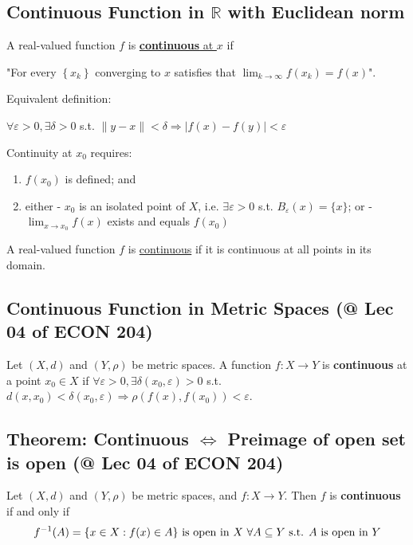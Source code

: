 \documentclass[11pt]{elegantbook}
\begin{document}
\subsection{Continuous Function in $\mathbb{R}$ with Euclidean norm}
\begin{definition}
    \normalfont
    A real-valued function $f$ is \underline{\textbf{continuous} at $x$} if
    
    "For every $\left\{x_{k}\right\}$ converging to $x$ satisfies that $\lim _{k \rightarrow \infty} f\left(x_{k}\right)=f(x)$".

    Equivalent definition:

    $\forall \varepsilon>0, \exists \delta>0$ s.t.
    $\|y-x\|<\delta \Rightarrow |f(x)-f(y)|<\varepsilon$
\end{definition}
Continuity at $x_0$ requires:
\begin{enumerate}
    \item $f(x_0)$ is defined; and
    \item either
    \subitem - $x_0$ is an isolated point of $X$, i.e. $\exists \varepsilon > 0$ s.t. $B_\varepsilon(x) = \{x\}$; or
    \subitem - $\lim_{x \rightarrow x_0} f(x)$ exists and equals $f(x_0)$
\end{enumerate}

\begin{definition}
    \normalfont
    A real-valued function $f$ is \underline{continuous} if it is continuous at all points in its domain.
\end{definition}

\subsection{Continuous Function in Metric Spaces \small{(@ Lec 04 of ECON 204)}}
\begin{definition}
\normalfont
    Let $(X, d)$ and $(Y, \rho)$ be metric spaces. A function $f : X \rightarrow Y$ is \textbf{continuous} at a point $x_0 \in X$ if $\forall \varepsilon > 0, \exists \delta(x_0, \varepsilon) > 0$ s.t. $d(x, x_0) < \delta(x_0, \varepsilon) \Rightarrow  \rho(f(x), f(x_0)) < \varepsilon$.
\end{definition}

\subsection{Theorem: Continuous $\Leftrightarrow$ Preimage of open set is open \small{(@ Lec 04 of ECON 204)}}
\begin{theorem}\label{Preimage of open set is open}
    Let $(X, d)$ and $(Y, \rho)$ be metric spaces, and $f : X \rightarrow Y$. Then $f$ is \textbf{continuous} if and only if
    $$f^{-1}(A)=\{x\in X: f(x)\in A\} \textnormal{ is open in $X$ $\forall A\subseteq Y$ s.t. $A$ is open in $Y$}$$
\end{theorem}
\end{document}
